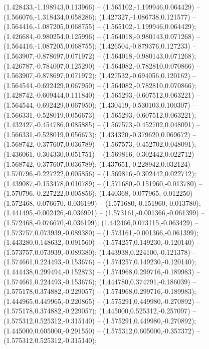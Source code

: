  (1.428433,-1.198943,0.113966) -- (1.565102,-1.199946,0.064429) -- (1.566076,-1.318434,0.058286);
 (1.427327,-1.086738,0.121577) -- (1.564416,-1.087205,0.068755) -- (1.565102,-1.199946,0.064429);
 (1.426684,-0.980254,0.125996) -- (1.564018,-0.980143,0.071268) -- (1.564416,-1.087205,0.068755);
 (1.426504,-0.879376,0.127233) -- (1.563907,-0.878697,0.071972) -- (1.564018,-0.980143,0.071268);
 (1.426787,-0.784007,0.125290) -- (1.564082,-0.782810,0.070866) -- (1.563907,-0.878697,0.071972);
 (1.427532,-0.694056,0.120162) -- (1.564544,-0.692429,0.067950) -- (1.564082,-0.782810,0.070866);
 (1.428742,-0.609444,0.111840) -- (1.565293,-0.607512,0.063221) -- (1.564544,-0.692429,0.067950);
 (1.430419,-0.530103,0.100307) -- (1.566331,-0.528019,0.056673) -- (1.565293,-0.607512,0.063221);
 (1.432427,-0.454786,0.085885) -- (1.567573,-0.452702,0.048091) -- (1.566331,-0.528019,0.056673);
 (1.434320,-0.379620,0.069672) -- (1.568742,-0.377607,0.036789) -- (1.567573,-0.452702,0.048091);
 (1.436061,-0.304330,0.051751) -- (1.569816,-0.302442,0.022712) -- (1.568742,-0.377607,0.036789);
 (1.437651,-0.228942,0.032124) -- (1.570796,-0.227222,0.005856) -- (1.569816,-0.302442,0.022712);
 (1.439087,-0.153478,0.010789) -- (1.571680,-0.151960,-0.013780) -- (1.570796,-0.227222,0.005856);
 (1.440368,-0.077965,-0.012250) -- (1.572468,-0.076670,-0.036199) -- (1.571680,-0.151960,-0.013780);
 (1.441495,-0.002426,-0.036991) -- (1.573161,-0.001366,-0.061399) -- (1.572468,-0.076670,-0.036199);
 (1.442466,0.073115,-0.063429) -- (1.573757,0.073939,-0.089380) -- (1.573161,-0.001366,-0.061399);
 (1.443280,0.148632,-0.091560) -- (1.574257,0.149230,-0.120140) -- (1.573757,0.073939,-0.089380);
 (1.443938,0.224100,-0.121378) -- (1.574661,0.224493,-0.153676) -- (1.574257,0.149230,-0.120140);
 (1.444438,0.299494,-0.152873) -- (1.574968,0.299716,-0.189983) -- (1.574661,0.224493,-0.153676);
 (1.444780,0.374791,-0.186039) -- (1.575178,0.374882,-0.229057) -- (1.574968,0.299716,-0.189983);
 (1.444965,0.449965,-0.220865) -- (1.575291,0.449980,-0.270892) -- (1.575178,0.374882,-0.229057);
 (1.445000,0.525312,-0.257097) -- (1.575312,0.525312,-0.315140) -- (1.575291,0.449980,-0.270892);
 (1.445000,0.605000,-0.291550) -- (1.575312,0.605000,-0.357372) -- (1.575312,0.525312,-0.315140);
